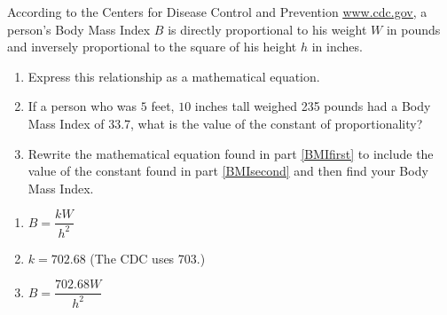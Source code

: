 {According to the Centers for Disease Control and Prevention \href{http://www.cdc.gov}{\underline{www.cdc.gov}}, a person's Body Mass Index $B$ is directly proportional to his weight $W$ in pounds and inversely proportional to the square of his height $h$ in inches. 

\begin{enumerate}

\item Express this relationship as a mathematical equation. \label{BMIfirst} 
\item If a person who was $5$ feet, $10$ inches tall weighed 235 pounds had a Body Mass Index of 33.7, what is the value of the constant of proportionality? \label{BMIsecond}
\item Rewrite the mathematical equation found in part \ref{BMIfirst} to include the value of the constant found in part \ref{BMIsecond} and then find your Body Mass Index.

\end{enumerate}}
{\begin{enumerate}
\item $B = \dfrac{kW}{h^{2}}$
\item $k = 702.68$ (The CDC uses 703.)
\item $B = \dfrac{702.68W}{h^{2}}$
\end{enumerate}
}